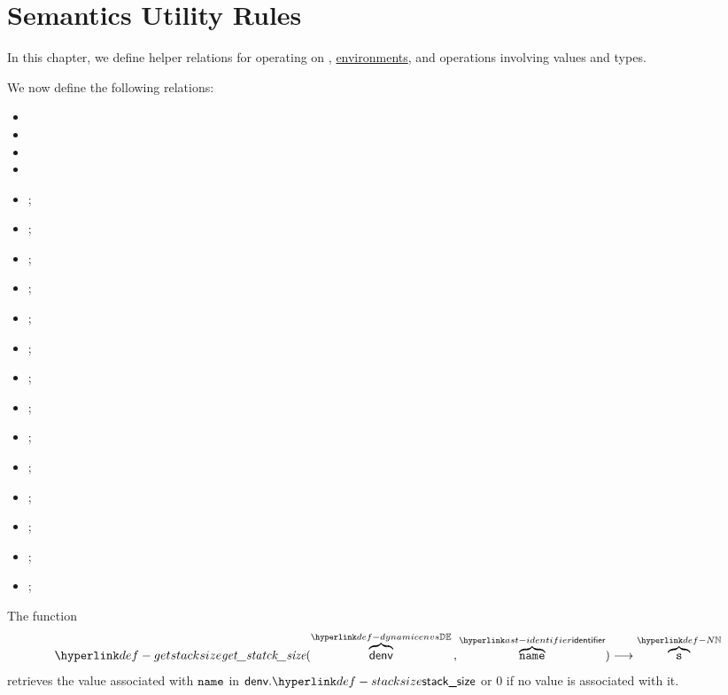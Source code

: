 \chapter{Semantics Utility Rules\label{chap:SemanticsUtilityRules}}

In this chapter, we define helper relations for operating on \nativevalues,
\hyperlink{def-envs}{environments}, and operations involving values and types.

We now define the following relations:
\begin{itemize}
  \item {}
  \item {}
  \item {}
  \item {}
  \item {};
  \item {};
  \item {};
  \item {};
  \item {};
  \item {};
  \item {};
  \item {};
  \item {};
  \item {};
  \item {};
  \item {};
  \item {};
  \item {};
\end{itemize}

\hypertarget{def-getstacksize}{}
The function
\[
\getstacksize(\overname{\denv}{\dynamicenvs} \aslsep \overname{\name}{\identifier}) \aslto \overname{\vs}{\N}
\]
retrieves the value associated with $\texttt{name}$ in $\denv.\stacksize$ or $0$ if no value is associated with it.


